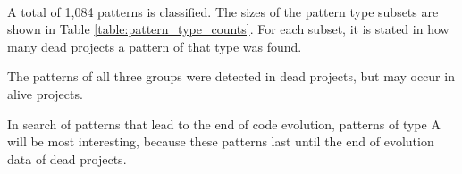 \paragraph{}
A total of 1,084 patterns is classified. The sizes of the pattern type subsets
are shown in Table \ref{table:pattern_type_counts}. For each subset, it is
stated in how many dead projects a pattern of that type was found.



\noindent
The patterns of all three groups were detected in dead projects, but may occur
in alive projects.

In search of patterns that lead to the end of code evolution, patterns of type
A will be most interesting, because these patterns last until the end of
evolution data of dead projects.

\begin{comment}
- Factual results
- Tables and figures for clarification

This chapter presents and clarifies the results obtained during the research.
The focus should be on the factual results, not the interpretation or
discussion. Tables and graphics should be used to increase the clarity of the
results where applicable.
Have a look at the the results chapter in this example thesis on Paul’s
homepage\footnote{http://homepages.cwi.nl/~paulk/thesesMasterSoftwareEngineering/2006/ArnoldLankamp.pdf}.
\end{comment}
